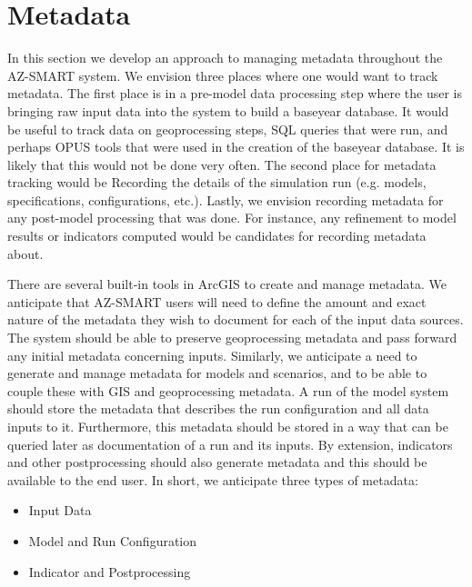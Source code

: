 \section{Metadata}

In this section we develop an approach to managing metadata throughout the AZ-SMART system.  
We envision three places where one would want to track metadata.  The first place is in a pre-model 
data processing step where the user is bringing raw input data into the system to build a baseyear 
database.  It would be useful to track data on geoprocessing steps, SQL queries that were run, and
perhaps OPUS tools that were used in the creation of the baseyear database.  It is likely that this
would not be done very often.  The second place for metadata tracking would be Recording the details
of the simulation run (e.g. models, specifications, configurations, etc.).  Lastly, we envision
recording metadata for any post-model processing that was done.  For instance, any refinement to
model results or indicators computed would be candidates for recording metadata about.

There are several built-in tools in ArcGIS to create and manage metadata.  We anticipate that AZ-SMART
users will need to define the amount and exact nature of the metadata they wish to document for each of
the input data sources.  The system should be able to preserve geoprocessing metadata and pass forward
any initial metadata concerning inputs.  Similarly, we anticipate a need to generate and manage
metadata for models and scenarios, and to be able to couple these with GIS and geoprocessing
metadata.  A run of the model system should store the metadata that describes the run configuration
and all data inputs to it.  Furthermore, this metadata should be stored in a way that can be queried
later as documentation of a run and its inputs.  By extension, indicators and other postprocessing
should also generate metadata and this should be available to the end user.  In short, we anticipate
three types of metadata:

\begin{itemize}
\item Input Data
\item Model and Run Configuration
\item Indicator and Postprocessing
\end{itemize}


